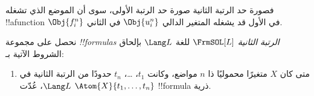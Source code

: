 \documentclass[../../../include/open-logic-section]{subfiles}
\begin{document}
\begin{explain}
فصورة حد الرتبة الثانية صورة حد الرتبة الأولى، سوى أن الموضع
الذي تشغله !!a{function} $\Obj{f^n_i}$ في الأول قد يشغله
المتغير الدالي $\Obj{u^n_i}$ في الثاني.
\end{explain}

\begin{defn}
نحصل على مجموعة \emph{!!{formula}s الرتبة الثانية}
$\FrmSOL[L]$ للغة $\Lang L$ بإلحاق الشروط الآتية
بـ:
\begin{enumerate}
\item متى كان $X$ متغيرًا محموليًا ذا $n$ مواضع،
وكانت $t_1$، \dots، $t_n$ حدودًا من الرتبة الثانية في
$\Lang L$، عُدّت $\Atom{X}{t_1,\ldots, t_n}$ !!{formula} ذرية.




\end{enumerate}
\end{defn}
\end{document}
